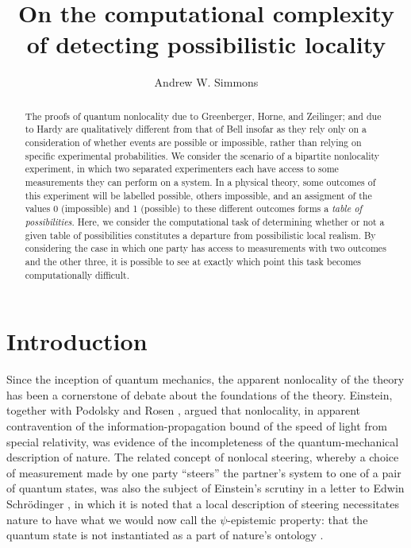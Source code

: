 \documentclass[reprint]{revtex4-1}
\theoremstyle{definition}
\begin{document}
\title{On the computational complexity of detecting possibilistic locality}
\author{Andrew W. Simmons}
\begin{abstract}
The proofs of quantum nonlocality due to Greenberger, Horne, and Zeilinger; and due to Hardy are qualitatively different from that of Bell insofar as they rely only on a consideration of whether events are possible or impossible, rather than relying on specific experimental probabilities. We consider the scenario of a bipartite nonlocality experiment, in which two separated experimenters each have access to some measurements they can perform on a system. In a physical theory, some outcomes of this experiment will be labelled possible, others impossible, and an assigment of the values 0 (impossible) and 1 (possible) to these different outcomes forms a \emph{table of possibilities}. Here, we consider the computational task of determining whether or not a given table of possibilities constitutes a departure from possibilistic local realism. By considering the case in which one party has access to measurements with two outcomes and the other three, it is possible to see at exactly which point this task becomes computationally difficult.
\end{abstract}
\maketitle

\section{Introduction}
Since the inception of quantum mechanics, the apparent nonlocality of the theory has been a cornerstone of debate about the foundations of the theory. Einstein, together with Podolsky and Rosen \cite{EPR}, argued that nonlocality, in apparent contravention of the information-propagation bound of the speed of light from special relativity, was evidence of the incompleteness of the quantum-mechanical description of nature. The related concept of nonlocal steering, whereby a choice of measurement made by one party ``steers'' the partner's system to one of a pair of quantum states, was also the subject of Einstein's scrutiny in a letter to Edwin Schr\"{o}dinger \cite{Eins1935-6-19}, in which it is noted that a local description of steering necessitates nature to have what we would now call the $\psi$-epistemic property: that the quantum state is not instantiated as a part of nature's ontology \cite{HR2007, SimmCW}.
\end{document}
